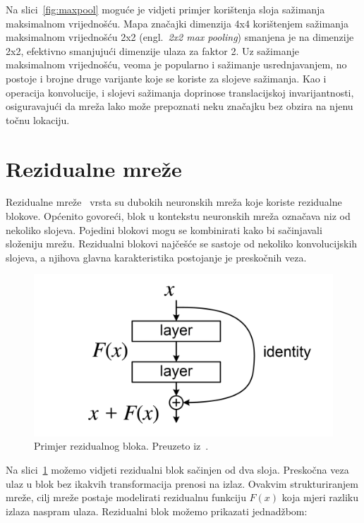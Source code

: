 \documentclass[times, utf8, zavrsni, numeric]{fer}
\begin{document}
Na slici~\ref{fig:maxpool} moguće je vidjeti primjer korištenja sloja sažimanja maksimalnom vrijednošću.
Mapa značajki dimenzija 4x4 korištenjem sažimanja maksimalnom vrijednošću 2x2 (engl.\ \textit{2x2 max pooling}) smanjena je na dimenzije 2x2, efektivno smanjujući dimenzije ulaza za faktor 2.
Uz sažimanje maksimalnom vrijednošću, veoma je popularno i sažimanje usrednjavanjem, no postoje i brojne druge varijante koje se koriste za slojeve sažimanja.
Kao i operacija konvolucije, i slojevi sažimanja doprinose translacijskoj invarijantnosti, osiguravajući da mreža lako može prepoznati neku značajku bez obzira na njenu točnu lokaciju.

\section{Rezidualne mreže}

Rezidualne mreže~\cite{he2016deep} vrsta su dubokih neuronskih mreža koje koriste rezidualne blokove. Općenito govoreći, blok u kontekstu neuronskih mreža označava niz od nekoliko slojeva. 
Pojedini blokovi mogu se kombinirati kako bi sačinjavali složeniju mrežu. 
Rezidualni blokovi najčešće se sastoje od nekoliko konvolucijskih slojeva, a njihova glavna karakteristika postojanje je preskočnih veza.

\begin{figure}[htb]
    \centering
    \includegraphics{ResBlock.png}
    \caption{Primjer rezidualnog bloka. Preuzeto iz~\cite{he2016deep}.}
    \label{fig:resblock}
\end{figure}

Na slici~\ref{fig:resblock} možemo vidjeti rezidualni blok sačinjen od dva sloja. Preskočna veza ulaz u blok bez ikakvih transformacija prenosi na izlaz. 
Ovakvim strukturiranjem mreže, cilj mreže postaje modelirati rezidualnu funkciju $F(x)$ koja mjeri razliku izlaza naspram ulaza. Rezidualni blok možemo prikazati jednadžbom:
\end{document}
